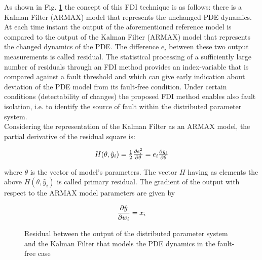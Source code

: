 \documentclass[journal]{IEEEtran}
\begin{document}
\noindent As shown in Fig. \ref{fig : residual} the concept of this FDI technique is as follows: there is a Kalman Filter (ARMAX) model that represents the unchanged PDE dynamics. At each time instant the output of the aforementioned reference model is compared to the output of the Kalman Filter (ARMAX) model that represents the changed dynamics of the PDE. The difference $e_i$ between these two output measurements is called residual. The statistical processing of a sufficiently large number of residuals through an FDI method provides an index-variable that is compared against a fault threshold and which can give early indication about deviation of the PDE model from its fault-free condition. Under certain conditions (detectability of changes) the proposed FDI method enables also fault isolation, i.e. to identify the source of fault within the distributed parameter system. \\

\noindent Considering the representation of the Kalman Filter as an ARMAX model, the partial derivative of the residual square is:

\begin{equation} \label{partial_derivative_residual}
\begin{tabular}{c}
$H(\theta,\hat{y}_i)={1 \over 2}{{{\partial}{e_i^2}} \over {{\partial}{\theta}}}={e_i}{{{\partial}{\hat{y}_i}} \over {{\partial}{\theta}}}$
\end{tabular}
\end{equation}

\noindent where $\theta$ is the vector of model's parameters. The vector $H$ having as elements the above $H(\theta,\hat{y}_i)$ is called primary residual. The gradient of the output with respect to the ARMAX model parameters are given by

\begin{equation} \label{derivative_output_weight}
{{{\partial}{\hat{y}}} \over {{\partial}w_i}}={{x_i}}
\end{equation}


\begin{figure}[htb]
\begin{center}
 \caption{Residual between the output of the distributed parameter system and the Kalman Filter that models the PDE dynamics in the fault-free case} \label{fig : residual}
\end{center}
\end{figure}
\end{document}
